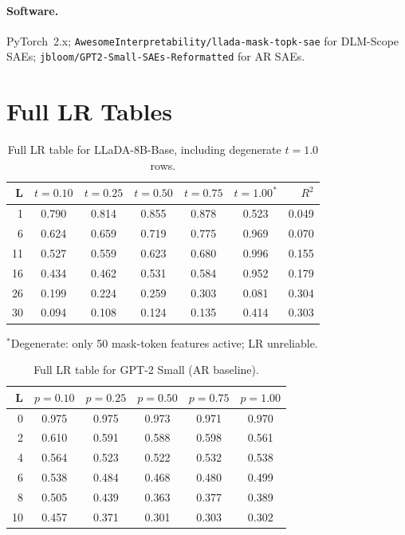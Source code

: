 \documentclass{article}
\begin{document}
\paragraph{Software.}
PyTorch~2.x; \texttt{AwesomeInterpretability/llada-mask-topk-sae} for DLM-Scope SAEs; \texttt{jbloom/GPT2-Small-SAEs-Reformatted} for AR SAEs.

\section{Full LR Tables}
\label{app:full_lr}

\begin{table}[h]
\centering
\caption{Full LR table for LLaDA-8B-Base, including degenerate $t=1.0$ rows.}
\label{tab:full_lr_dlm}
\vskip 0.1in
\begin{small}
\begin{sc}
\begin{tabular}{r ccccc r}
\toprule
\textbf{L} & $t{=}0.10$ & $t{=}0.25$ & $t{=}0.50$ & $t{=}0.75$ & $t{=}1.00^*$ & $R^2$ \\
\midrule
1  & 0.790 & 0.814 & 0.855 & 0.878 & 0.523 & 0.049 \\
6  & 0.624 & 0.659 & 0.719 & 0.775 & 0.969 & 0.070 \\
11 & 0.527 & 0.559 & 0.623 & 0.680 & 0.996 & 0.155 \\
16 & 0.434 & 0.462 & 0.531 & 0.584 & 0.952 & 0.179 \\
26 & 0.199 & 0.224 & 0.259 & 0.303 & 0.081 & 0.304 \\
30 & 0.094 & 0.108 & 0.124 & 0.135 & 0.414 & 0.303 \\
\bottomrule
\end{tabular}
\end{sc}
\end{small}
\vskip -0.05in
{\small $^*$Degenerate: only 50 mask-token features active; LR unreliable.}
\end{table}

\begin{table}[h]
\centering
\caption{Full LR table for GPT-2 Small (AR baseline).}
\label{tab:full_lr_ar}
\vskip 0.1in
\begin{small}
\begin{sc}
\begin{tabular}{r ccccc}
\toprule
\textbf{L} & $p{=}0.10$ & $p{=}0.25$ & $p{=}0.50$ & $p{=}0.75$ & $p{=}1.00$ \\
\midrule
0  & 0.975 & 0.975 & 0.973 & 0.971 & 0.970 \\
2  & 0.610 & 0.591 & 0.588 & 0.598 & 0.561 \\
4  & 0.564 & 0.523 & 0.522 & 0.532 & 0.538 \\
6  & 0.538 & 0.484 & 0.468 & 0.480 & 0.499 \\
8  & 0.505 & 0.439 & 0.363 & 0.377 & 0.389 \\
10 & 0.457 & 0.371 & 0.301 & 0.303 & 0.302 \\
\bottomrule
\end{tabular}
\end{sc}
\end{small}
\end{table}
\end{document}
